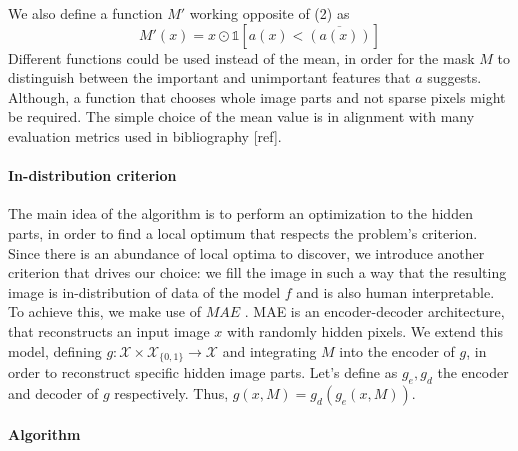 We also define a function $M'$ working opposite of (2) as
\begin{equation}
    M'(x) = x \odot \mathds{1}[a(x) < \overline{(a(x))}]
\end{equation}
Different functions could be used instead of the mean, in order for the mask $M$ to distinguish between the important and unimportant features that $a$ suggests. Although, a function that chooses whole image parts and not sparse pixels might be required. The simple choice of the mean value is in alignment with many evaluation metrics used in bibliography [ref]. 


\paragraph{In-distribution criterion}

The main idea of the algorithm is to perform an optimization to the hidden parts, in order to find a local optimum that respects the problem's criterion. Since there is an abundance of local optima to discover, we introduce another criterion that drives our choice: we fill the image in such a way that the resulting image is in-distribution of data of the model $f$ and is also human interpretable. To achieve this, we make use of $MAE$ \citep{9879206}. MAE is an encoder-decoder architecture, that reconstructs an input image $x$ with randomly hidden pixels. We extend this model, defining $g: \mathcal{X} \times \mathcal{X}_{\{0, 1 \}} \to \mathcal{X}$ and integrating $M$ into the encoder of $g$, in order to reconstruct specific hidden image parts. Let's define as $g_e, g_d$ the encoder and decoder of $g$ respectively. Thus, $g(x, M) = g_d(g_e(x, M))$.


\paragraph{Algorithm}

